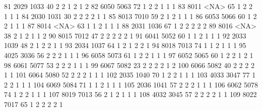 \documentclass[
  letterpaper,
  DIV=11,
  numbers=noendperiod]{scrreprt}
\newenvironment{Shaded}{\begin{snugshade}}{\end{snugshade}}
\newcommand{\NormalTok}[1]{\textcolor[rgb]{0.00,0.23,0.31}{#1}}
\begin{document}
\begin{Shaded}
\begin{Highlighting}[]
\NormalTok{81  2029 1033  40          2      2        1         2    1                 2}
\NormalTok{82  6050 5063  72          1      2        2         1    1                 1}
\NormalTok{83  8011 \textless{}NA\textgreater{}  65          1      2        2         1    1                 1}
\NormalTok{84  2030 1031  30          2      2        2         2    1                 1}
\NormalTok{85  8013 7010  59          2      1        2         1    1                 1}
\NormalTok{86  6053 5066  60          1      2        2         1    1                 1}
\NormalTok{87  8014 \textless{}NA\textgreater{}  63          1      1        2         1    1                 1}
\NormalTok{88  2031 1036  67          1      2        2         2    2                 2}
\NormalTok{89  8016 \textless{}NA\textgreater{}  38          2      1        2         1    1                 2}
\NormalTok{90  8015 7012  47          2      2        2         2    2                 1}
\NormalTok{91  6041 5052  60          1      1        2         1    1                 1}
\NormalTok{92  2033 1039  48          2      1        2         2    1                 1}
\NormalTok{93  2034 1037  64          1      2        1         2    2                 1}
\NormalTok{94  8018 7013  74          1      1        2         1    1                 1}
\NormalTok{95  4025 3036  56          2      2        2         1    1                 1}
\NormalTok{96  6058 5073  61          1      2        2         1    1                 1}
\NormalTok{97  6052 5065  60          1      2        2         1    2                 1}
\NormalTok{98  6061 5077  53          2      2        2         1    1                 1}
\NormalTok{99  6067 5082  23          2      2        2         2    1                 2}
\NormalTok{100 6066 5082  40          2      2        2         2    1                 1}
\NormalTok{101 6064 5080  52          2      2        2         1    1                 1}
\NormalTok{102 2035 1040  70          1      2        2         1    1                 1}
\NormalTok{103 4033 3047  77          1      2        2         1    1                 1}
\NormalTok{104 6069 5084  71          1      1        2         1    1                 1}
\NormalTok{105 2036 1041  57          2      2        2         1    1                 1}
\NormalTok{106 6062 5078  74          1      2        2         1    1                 1}
\NormalTok{107 8019 7013  56          2      1        2         1    1                 1}
\NormalTok{108 4032 3045  57          2      2        2         2    1                 1}
\NormalTok{109 8022 7017  65          1      2        2         2    2                 1}

\end{Highlighting}
\end{Shaded}
\end{document}

